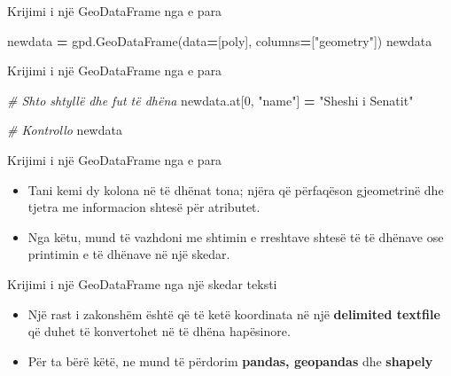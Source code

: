 \documentclass[
  ignorenonframetext,
]{beamer}
\newenvironment{Shaded}{\begin{snugshade}}{\end{snugshade}}
\newcommand{\CommentTok}[1]{\textcolor[rgb]{0.56,0.35,0.01}{\textit{#1}}}
\newcommand{\DecValTok}[1]{\textcolor[rgb]{0.00,0.00,0.81}{#1}}
\newcommand{\NormalTok}[1]{#1}
\newcommand{\OperatorTok}[1]{\textcolor[rgb]{0.81,0.36,0.00}{\textbf{#1}}}
\newcommand{\StringTok}[1]{\textcolor[rgb]{0.31,0.60,0.02}{#1}}
\begin{document}
\begin{frame}[fragile]{Krijimi i një GeoDataFrame nga e para}
\protect\hypertarget{krijimi-i-njuxeb-geodataframe-nga-e-para-5}{}

\begin{Shaded}
\begin{Highlighting}[]
\NormalTok{newdata }\OperatorTok{=}\NormalTok{ gpd.GeoDataFrame(data}\OperatorTok{=}\NormalTok{[poly], columns}\OperatorTok{=}\NormalTok{[}\StringTok{"geometry"}\NormalTok{])}
\NormalTok{newdata}
\end{Highlighting}
\end{Shaded}
\end{frame}

\begin{frame}[fragile]{Krijimi i një GeoDataFrame nga e para}
\protect\hypertarget{krijimi-i-njuxeb-geodataframe-nga-e-para-6}{}

\begin{Shaded}
\begin{Highlighting}[]
\CommentTok{\# Shto shtyllë dhe fut të dhëna}
\NormalTok{newdata.at[}\DecValTok{0}\NormalTok{, }\StringTok{"name"}\NormalTok{] }\OperatorTok{=} \StringTok{"Sheshi i Senatit"}

\CommentTok{\# Kontrollo}
\NormalTok{newdata}
\end{Highlighting}
\end{Shaded}
\end{frame}

\begin{frame}{Krijimi i një GeoDataFrame nga e para}
\protect\hypertarget{krijimi-i-njuxeb-geodataframe-nga-e-para-7}{}
\begin{itemize}
\item
  Tani kemi dy kolona në të dhënat tona; njëra që përfaqëson gjeometrinë
  dhe tjetra me informacion shtesë për atributet.
\item
  Nga këtu, mund të vazhdoni me shtimin e rreshtave shtesë të të dhënave
  ose printimin e të dhënave në një skedar.
\end{itemize}
\end{frame}

\begin{frame}{Krijimi i një GeoDataFrame nga një skedar teksti}
\protect\hypertarget{krijimi-i-njuxeb-geodataframe-nga-njuxeb-skedar-teksti}{}
\begin{itemize}
\item
  Një rast i zakonshëm është që të ketë koordinata në një
  \textbf{delimited textfile} që duhet të konvertohet në të dhëna
  hapësinore.
\item
  Për ta bërë këtë, ne mund të përdorim \textbf{pandas, geopandas} dhe
  \textbf{shapely}
\end{itemize}
\end{frame}
\end{document}
